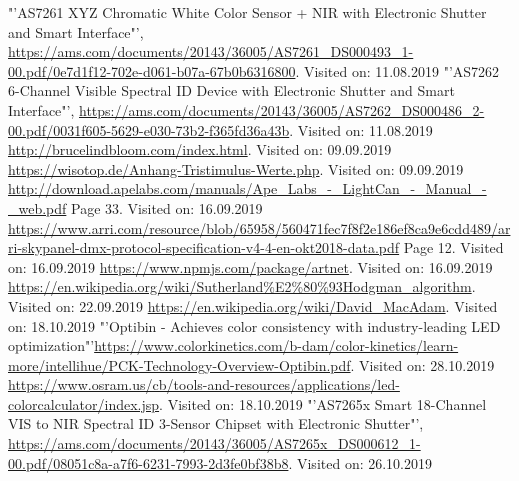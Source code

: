 \documentclass[11pt]{scrartcl}
\begin{document}
\begin{thebibliography}{xxxxxxxxxxxxxxxxxxx}
    "'AS7261 XYZ Chromatic White Color Sensor + NIR with Electronic Shutter and Smart Interface"', \url{https://ams.com/documents/20143/36005/AS7261_DS000493_1-00.pdf/0e7d1f12-702e-d061-b07a-67b0b6316800}. Visited on: 11.08.2019
    "'AS7262 6-Channel Visible Spectral ID Device with Electronic Shutter and Smart Interface"', \url{https://ams.com/documents/20143/36005/AS7262_DS000486_2-00.pdf/0031f605-5629-e030-73b2-f365fd36a43b}. Visited on: 11.08.2019
     \url{http://brucelindbloom.com/index.html}. Visited on: 09.09.2019
     \url{https://wisotop.de/Anhang-Tristimulus-Werte.php}. Visited on: 09.09.2019
     \url{http://download.apelabs.com/manuals/Ape_Labs_-_LightCan_-_Manual_-_web.pdf} Page 33. Visited on: 16.09.2019
     \url{https://www.arri.com/resource/blob/65958/560471fec7f8f2e186ef8ca9e6cdd489/arri-skypanel-dmx-protocol-specification-v4-4-en-okt2018-data.pdf} Page 12. Visited on: 16.09.2019
     \url{https://www.npmjs.com/package/artnet}. Visited on: 16.09.2019
     \url{https://en.wikipedia.org/wiki/Sutherland%E2%80%93Hodgman_algorithm}. Visited on: 22.09.2019
     \url{https://en.wikipedia.org/wiki/David_MacAdam}. Visited on: 18.10.2019
     "'Optibin - Achieves color consistency with industry-leading LED optimization"'\url{https://www.colorkinetics.com/b-dam/color-kinetics/learn-more/intellihue/PCK-Technology-Overview-Optibin.pdf}. Visited on: 28.10.2019
     \url{https://www.osram.us/cb/tools-and-resources/applications/led-colorcalculator/index.jsp}. Visited on: 18.10.2019
    "'AS7265x Smart 18-Channel VIS to NIR Spectral ID 3-Sensor Chipset with Electronic Shutter"', \url{https://ams.com/documents/20143/36005/AS7265x_DS000612_1-00.pdf/08051c8a-a7f6-6231-7993-2d3fe0bf38b8}. Visited on: 26.10.2019
\end{thebibliography}
\endgroup
\clearpage
\end{document}
